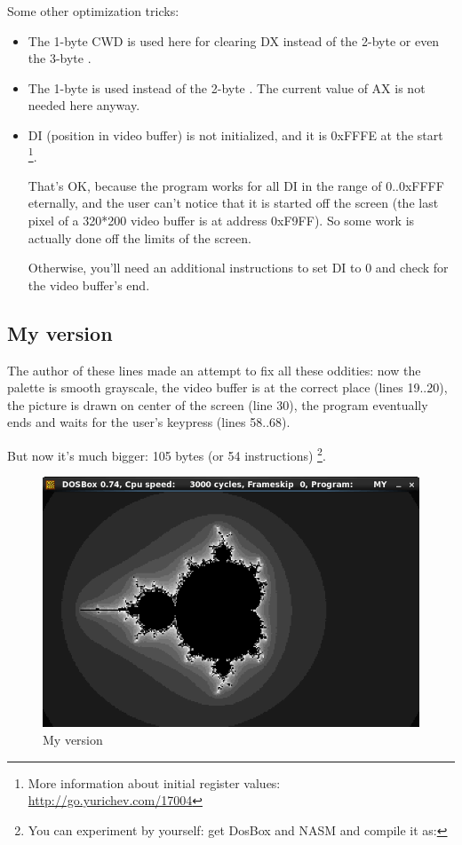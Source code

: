 Some other optimization tricks:

\begin{itemize}
\item The 1-byte CWD is used here 
for clearing DX instead of the 2-byte  or even the 3-byte .

\item The 1-byte  is used instead of the 2-byte 
. 
The current value of AX is not needed here anyway.

\item DI (position in video buffer) is not initialized, and it is 0xFFFE at the start
\footnote{More information about initial register values: 
\url{http://go.yurichev.com/17004}}.

That's OK, because the program works for all DI in the range of 0..0xFFFF eternally, 
and the user can't notice
that it is started off the screen (the last pixel of a 320*200 video buffer is at address 0xF9FF).
So some work is actually done 
off the limits of the screen.

Otherwise, you'll need an additional instructions to set DI to 0 and check for the video buffer's end.

\end{itemize}

\newcommand{\MyFixedVersion}{My  version}
\subsection{\MyFixedVersion}




The author of these lines made an attempt to fix all these oddities: now the palette is smooth grayscale, the video buffer is at the correct place 
(lines 19..20),
the picture is drawn on center of the screen (line 30), the program eventually ends and waits for the user's keypress 
(lines 58..68).

But now it's much bigger: 105 bytes (or 54 instructions)
\footnote{
You can experiment by yourself: get DosBox and NASM and compile it as: 
}.

\begin{figure}[H]
\centering
\includegraphics[scale=\FigScale]{examples/demos/mandelbrot/fixed.png}
\caption{\MyFixedVersion}
\label{fig:mandelbrot_fixed}
\end{figure}
